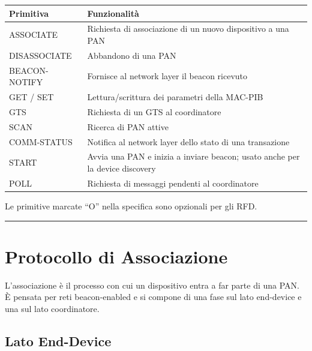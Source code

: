 \documentclass[
  italian,
  openany]{book}
\newcounter{none} %
\begin{document}
{\def\LTcaptype{none} %
\begin{longtable}[]{@{}
  >{\raggedright\arraybackslash}p{}
  >{\raggedright\arraybackslash}p{}@{}}
\toprule\noalign{}
\begin{minipage}[b]{\linewidth}\raggedright
Primitiva
\end{minipage} & \begin{minipage}[b]{\linewidth}\raggedright
Funzionalità
\end{minipage} \\
\midrule\noalign{}
\endhead
\bottomrule\noalign{}
\endlastfoot
ASSOCIATE & Richiesta di associazione di un nuovo dispositivo a una
PAN \\
DISASSOCIATE & Abbandono di una PAN \\
BEACON-NOTIFY & Fornisce al network layer il beacon ricevuto \\
GET / SET & Lettura/scrittura dei parametri della MAC-PIB \\
GTS & Richiesta di un GTS al coordinatore \\
SCAN & Ricerca di PAN attive \\
COMM-STATUS & Notifica al network layer dello stato di una
transazione \\
START & Avvia una PAN e inizia a inviare beacon; usato anche per la
device discovery \\
POLL & Richiesta di messaggi pendenti al coordinatore \\
\end{longtable}
}

Le primitive marcate ``O'' nella specifica sono opzionali per gli RFD.

\begin{center}\rule{0.5\linewidth}{0.5pt}\end{center}

\section{Protocollo di Associazione}\label{protocollo-di-associazione}

L'associazione è il processo con cui un dispositivo entra a far parte di
una PAN. È pensata per reti beacon-enabled e si compone di una fase sul
lato end-device e una sul lato coordinatore.

\subsection{Lato End-Device}\label{lato-end-device}
\end{document}
